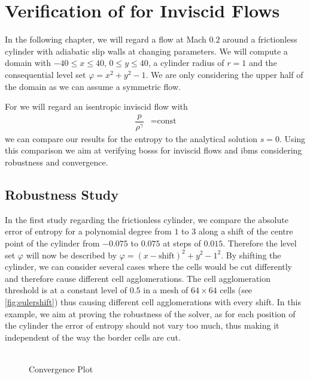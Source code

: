 \chapter{Verification of  for Inviscid Flows}
	\label{eulerVerification}
	In the following chapter, we will regard a flow at Mach $0.2$ around a frictionless cylinder with adiabatic slip walls at changing parameters.
	We will compute a domain with  $-40 \leq x \leq 40$, $0 \leq y \leq 40$, a cylinder radius of $r = 1$ and the consequential level set $\varphi = x^2 + y^2 -1$. We are only considering the upper half of the domain as we can assume a symmetric flow. \\ \indent
	
	For we will regard an isentropic inviscid flow with 
	\begin{align}
			\dfrac{p}{\rho^\gamma} &= \text{const}
	\end{align}
	we can compare our results for the entropy to the analytical solution $s = 0$. Using this comparison we aim at verifying \gls{bosss} for inviscid flows and \gls{ibm}s considering robustness and convergence.
	
	\section{Robustness Study}
	In the first study regarding the frictionless cylinder, we compare the absolute error of entropy for a polynomial degree from $1$ to $3$ along a shift of the centre point of the cylinder from $-0.075$ to $0.075$ at steps of $0.015$. Therefore the level set $\varphi$ will now be described by $\varphi = (x-\text{shift})^2 + y^2 - 1^2$. By shifting the cylinder, we can consider several cases where the cells would be cut differently and therefore cause different cell agglomerations. The cell agglomeration threshold is at a constant level of $0.5$ in a mesh of $64 \times 64$ cells (see \cref{fig:eulershift}) thus causing different cell agglomerations with every shift. In this example, we aim at proving the robustness of the solver, as for each position of the cylinder the error of entropy should not vary too much, thus making it independent of the way the border cells are cut. \\ \\

	\begin{figure}[htp]	
		\centering
		\caption{Convergence Plot}
		\label{shifterror}
	\end{figure}
	

